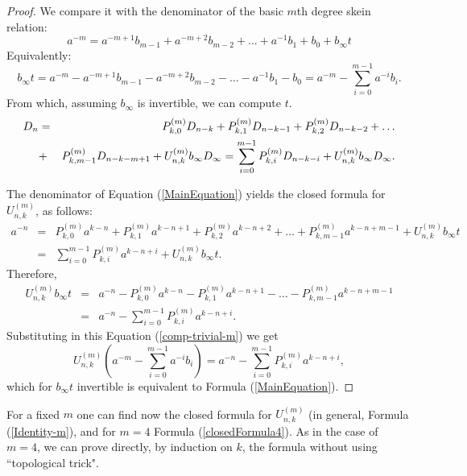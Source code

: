\documentclass[12pt]{amsart}
\begin{document}
\begin{proof}
We compare it with the denominator of the basic $m$th degree skein relation:
\begin{equation}\label{comp-trivial-m}
a^{-m}=a^{-m+1}b_{m-1} + a^{-m+2}b_{m-2}+ ... +a^{-1}b_1 +b_0 +b_\infty t
\end{equation}
Equivalently:
$$b_\infty t= a^{-m}- a^{-m+1}b_{m-1} - a^{-m+2}b_{m-2} -...-a^{-1}b_1-b_0= a^{-m}- \sum_{i=0}^{m-1} a^{-i}b_i. $$
From which, assuming $b_\infty$ is invertible, we can compute $t$.
\begin{eqnarray}
\label{MainEquation}
D_n &=& P_{k,0}^{(m)} D_{n-k} + P_{k,1}^{(m)} D_{n-k-1} + P_{k,2}^{(m)} D_{n-k-2} +\ldots \\ \notag
&+& P_{k,m-1}^{(m)} D_{n-k-m+1} + U^{(m)}_{n,k}b_\infty D_\infty = \sum_{i=0}^{m-1} P_{k,i}^{(m)} D_{n-k-i} + U^{(m)}_{n,k}b_\infty D_\infty.
\end{eqnarray}

The denominator of Equation (\ref{MainEquation}) yields the closed formula for $U^{(m)}_{n,k}$, as follows:
\begin{eqnarray*}
a^{-n} &=& P_{k,0}^{(m)} a^{k-n} + P_{k,1}^{(m)} a^{k-n+1} + P_{k,2}^{(m)} a^{k-n+2} + \ldots + P_{k,m-1}^{(m)}a^{k-n+m-1}  + U^{(m)}_{n,k}b_\infty t\\
&=& \sum_{i=0}^{m-1} P_{k,i}^{(m)}a^{k-n+i}  + U^{(m)}_{n,k}b_\infty t.
\end{eqnarray*}
Therefore,
\begin{eqnarray*}
U^{(m)}_{n,k}b_\infty t &=& a^{-n}-P_{k,0}^{(m)} a^{k-n} - P_{k,1}^{(m)} a^{k-n+1} - \ldots - P_{k,m-1}^{(m)}a^{k-n+m-1}\\
&=&a^{-n}- \sum_{i=0}^{m-1} P_{k,i}^{(m)}a^{k-n+i}.
\end{eqnarray*}
Substituting in this Equation (\ref{comp-trivial-m}) we get
\begin{equation*}
U^{(m)}_{n,k}(a^{-m}- \sum_{i=0}^{m-1} a^{-i}b_i)=a^{-n}- \sum_{i=0}^{m-1} P_{k,i}^{(m)}a^{k-n+i},    
\end{equation*} 
which for $b_\infty t$ invertible is equivalent to Formula (\ref{MainEquation}).
\end{proof}
For a fixed $m$ one can find now the closed formula for $U^{(m)}_{n,k}$ (in general, Formula  (\ref{Identity-m}), and for $m=4$ Formula (\ref{closedFormula4}). As in the case of $m=4$, we can prove directly, by induction on $k$, the formula without using ``topological trick".
\end{document}
